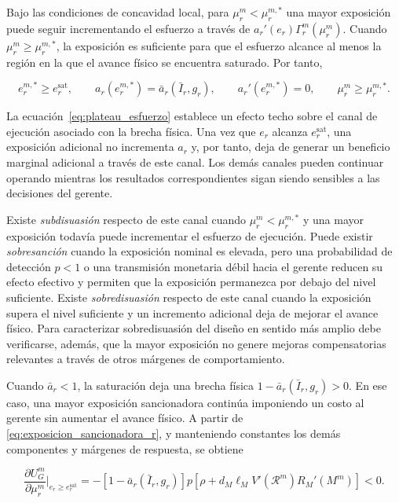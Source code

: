 Bajo las condiciones de concavidad local, para \(\mu_r^m<\mu_r^{m,*}\) una mayor exposición puede seguir incrementando el esfuerzo a través de \(a_r'(e_r)\Gamma_r^m(\mu_r^m)\). Cuando \(\mu_r^m\geq\mu_r^{m,*}\), la exposición es suficiente para que el esfuerzo alcance al menos la región en la que el avance físico se encuentra saturado. Por tanto,

\begin{equation}
\label{eq:plateau_esfuerzo}
e_r^{m,*}
\geq
e_r^{\mathrm{sat}},
\qquad
a_r(e_r^{m,*})
=
\bar a_r(\bar I_r,g_r),
\qquad
a_r'(e_r^{m,*})
=
0,
\qquad
\mu_r^m
\geq
\mu_r^{m,*}.
\end{equation}

La ecuación~\eqref{eq:plateau_esfuerzo} establece un efecto techo sobre el canal de ejecución asociado con la brecha física. Una vez que \(e_r\) alcanza \(e_r^{\mathrm{sat}}\), una exposición adicional no incrementa \(a_r\) y, por tanto, deja de generar un beneficio marginal adicional a través de este canal. Los demás canales pueden continuar operando mientras los resultados correspondientes sigan siendo sensibles a las decisiones del gerente.

Existe \emph{subdisuasión} respecto de este canal cuando \(\mu_r^m<\mu_r^{m,*}\) y una mayor exposición todavía puede incrementar el esfuerzo de ejecución. Puede existir \emph{sobresanción} cuando la exposición nominal es elevada, pero una probabilidad de detección \(p<1\) o una transmisión monetaria débil hacia el gerente reducen su efecto efectivo y permiten que la exposición permanezca por debajo del nivel suficiente. Existe \emph{sobredisuasión} respecto de este canal cuando la exposición supera el nivel suficiente y un incremento adicional deja de mejorar el avance físico. Para caracterizar sobredisuasión del diseño en sentido más amplio debe verificarse, además, que la mayor exposición no genere mejoras compensatorias relevantes a través de otros márgenes de comportamiento.

Cuando \(\bar a_r<1\), la saturación deja una brecha física \(1-\bar a_r(\bar I_r,g_r)>0\). En ese caso, una mayor exposición sancionadora continúa imponiendo un costo al gerente sin aumentar el avance físico. A partir de \eqref{eq:exposicion_sancionadora_r}, y manteniendo constantes los demás componentes y márgenes de respuesta, se obtiene

\begin{equation}
\label{eq:utilidad_multa_excesiva}
\frac{\partial
U_G^m}
{\partial \mu_r^m}
\bigg|_{e_r\geq e_r^{\mathrm{sat}}}
=
-
\left[
1-\bar a_r(\bar I_r,g_r)
\right]
p
\left[
\rho
+
d_M\ell_M
V'\!\left(\mathcal R^m\right)
R_M'\!\left(M^m\right)
\right]
<
0.
\end{equation}

